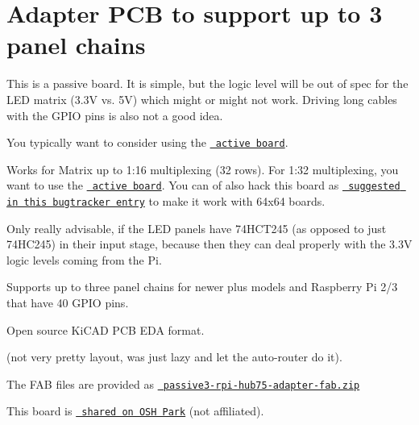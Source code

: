\chapter{Adapter PCB to support up to 3 panel chains}
\hypertarget{md_matrix_2adapter_2passive-3_2README}{}\label{md_matrix_2adapter_2passive-3_2README}

\begin{DoxyItemize}
\item This is a passive board. It is simple, but the logic level will be out of spec for the LED matrix (3.\+3V vs. 5V) which might or might not work. Driving long cables with the GPIO pins is also not a good idea.
\item You typically want to consider using the \href{../active-3}{\texttt{ active board}}.
\item Works for Matrix up to 1\+:16 multiplexing (32 rows). For 1\+:32 multiplexing, you want to use the \href{../active-3}{\texttt{ active board}}. You can of also hack this board as \href{https://github.com/hzeller/rpi-rgb-led-matrix/issues/360\#issuecomment-321104348}{\texttt{ suggested in this bugtracker entry}} to make it work with 64x64 boards.
\item Only really advisable, if the LED panels have 74HCT245 (as opposed to just 74HC245) in their input stage, because then they can deal properly with the 3.\+3V logic levels coming from the Pi.
\item Supports up to three panel chains for newer plus models and Raspberry Pi 2/3 that have 40 GPIO pins.
\item Open source Ki\+CAD PCB EDA format.
\item (not very pretty layout, was just lazy and let the auto-\/router do it).
\item The FAB files are provided as \href{./passive3-rpi-hub75-adapter-fab.zip}{\texttt{ passive3-\/rpi-\/hub75-\/adapter-\/fab.\+zip}}
\end{DoxyItemize}

This board is \href{https://oshpark.com/shared_projects/FNAtZUsP}{\texttt{ shared on OSH Park}} (not affiliated).

 